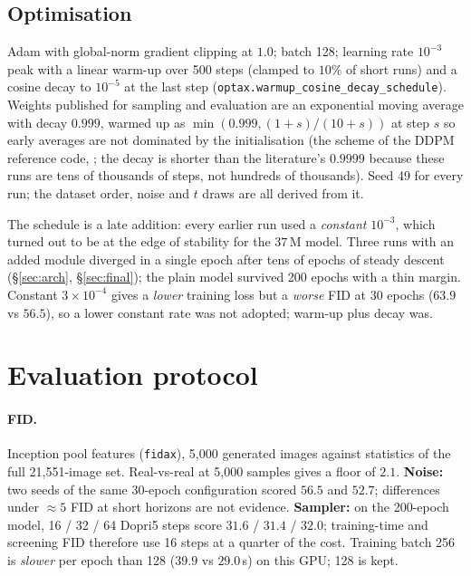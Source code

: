 \documentclass[11pt]{article}
\begin{document}
\subsection{Optimisation}\label{sec:optim}

Adam with global-norm gradient clipping at $1.0$; batch 128; learning rate $10^{-3}$
peak with a linear warm-up over 500 steps (clamped to $10\%$ of short runs) and a cosine
decay to $10^{-5}$ at the last step (\texttt{optax.warmup\_cosine\_decay\_schedule}).
Weights published for sampling and evaluation are an exponential moving average with
decay $0.999$, warmed up as $\min(0.999,(1+s)/(10+s))$ at step $s$ so early averages
are not dominated by the initialisation (the scheme of the DDPM reference code,
\citealp{ho2020ddpm}; the decay is shorter than the literature's $0.9999$ because these
runs are tens of thousands of steps, not hundreds of thousands). Seed 49 for every
run; the dataset order, noise and $t$ draws are all derived from it.

The schedule is a late addition: every earlier run used a \emph{constant} $10^{-3}$,
which turned out to be at the edge of stability for the $37$\,M model. Three runs with an
added module diverged in a single epoch after tens of epochs of steady descent
(\S\ref{sec:arch}, \S\ref{sec:final}); the plain model survived 200 epochs with a thin
margin. Constant $3\times10^{-4}$ gives a \emph{lower} training loss but a \emph{worse}
FID at 30 epochs ($63.9$ vs $56.5$), so a lower constant rate was not adopted;
warm-up plus decay was.

\section{Evaluation protocol}\label{sec:protocol}

\paragraph{FID.} Inception pool features (\texttt{fidax}), 5{,}000 generated images
against statistics of the full 21{,}551-image set. Real-vs-real at 5{,}000 samples gives
a floor of $2.1$. \textbf{Noise:} two seeds of the same 30-epoch configuration scored
$56.5$ and $52.7$; differences under $\approx5$ FID at short horizons are not evidence.
\textbf{Sampler:} on the 200-epoch model, 16 / 32 / 64 Dopri5 steps score
$31.6$ / $31.4$ / $32.0$; training-time and screening FID therefore use 16 steps at a
quarter of the cost. Training batch 256 is \emph{slower} per epoch than 128
($39.9$ vs $29.0$\,s) on this GPU; 128 is kept.
\end{document}
